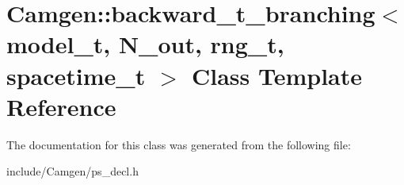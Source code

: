 \hypertarget{a00024}{\section{Camgen\-:\-:backward\-\_\-t\-\_\-branching$<$ model\-\_\-t, N\-\_\-out, rng\-\_\-t, spacetime\-\_\-t $>$ Class Template Reference}
\label{a00024}
}


The documentation for this class was generated from the following file\-:\begin{DoxyCompactItemize}
\item 
include/\-Camgen/ps\-\_\-decl.\-h\end{DoxyCompactItemize}
